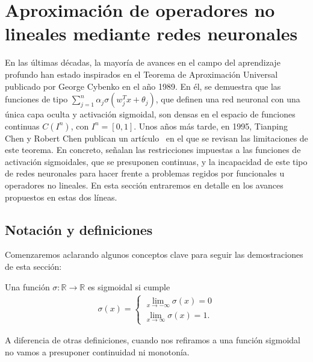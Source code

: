 

\chapter{Aproximación de operadores no lineales mediante redes neuronales}\label{ch:sexto-capitulo}

En las últimas décadas, la mayoría de avances en el campo del aprendizaje profundo han estado inspirados en el Teorema de Aproximación Universal~\cite{cybenko1989approximation} publicado por  George Cybenko en el año 1989. En él, se demuestra que las funciones de tipo $ \sum_{j=1}^n \alpha_{j}\sigma(w_{j}^T x + \theta_j)$, que definen una red neuronal con una única capa oculta y activación sigmoidal, son densas en el espacio de funciones continuas $C(I^n)$, con $I^n = [0,1]$. Unos años más tarde, en 1995, Tianping Chen y Robert Chen publican un artículo~\cite{chen1995universal} en el que se revisan las limitaciones de este teorema. En concreto, señalan las restricciones impuestas a las funciones de activación sigmoidales, que se presuponen continuas, y la incapacidad  de este tipo de redes neuronales para hacer frente a problemas regidos por funcionales u operadores no lineales. En esta sección entraremos en detalle en los avances propuestos en estas dos líneas. 

\section{Notación y definiciones}
Comenzaremos aclarando algunos conceptos clave para seguir las demostraciones de esta sección: 
\begin{definicion}
Una función $\sigma:\mathds{R}\rightarrow\mathds{R}$ es sigmoidal si cumple
\begin{gather}
\sigma(x) = 
\begin{cases}
	\lim_{x\rightarrow - \infty}\sigma (x) = 0  \\
	\lim_{x\rightarrow \infty}\sigma (x) = 1.  		\end{cases}
\end{gather}
\end{definicion}
\begin{observacion}
A diferencia de otras definiciones, cuando nos refiramos a una función sigmoidal no vamos a presuponer continuidad ni monotonía.
\end{observacion}

